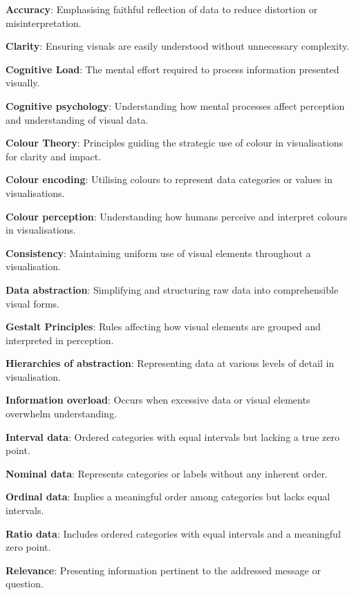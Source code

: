 \documentclass{article}\usepackage[]{graphicx}\usepackage[]{xcolor}
\numberwithin{equation}{section}
\begin{document}
\begin{itemise}
    \item \textbf{Accuracy}: Emphasising faithful reflection of data to reduce distortion or misinterpretation.
    \item \textbf{Clarity}: Ensuring visuals are easily understood without unnecessary complexity.
    \item \textbf{Cognitive Load}: The mental effort required to process information presented visually.
    \item \textbf{Cognitive psychology}: Understanding how mental processes affect perception and understanding of visual data.
    \item \textbf{Colour Theory}: Principles guiding the strategic use of colour in visualisations for clarity and impact.
    \item \textbf{Colour encoding}: Utilising colours to represent data categories or values in visualisations.
    \item \textbf{Colour perception}: Understanding how humans perceive and interpret colours in visualisations.
    \item \textbf{Consistency}: Maintaining uniform use of visual elements throughout a visualisation.
    \item \textbf{Data abstraction}: Simplifying and structuring raw data into comprehensible visual forms.
    \item \textbf{Gestalt Principles}: Rules affecting how visual elements are grouped and interpreted in perception.
    \item \textbf{Hierarchies of abstraction}: Representing data at various levels of detail in visualisation.
    \item \textbf{Information overload}: Occurs when excessive data or visual elements overwhelm understanding.
    \item \textbf{Interval data}: Ordered categories with equal intervals but lacking a true zero point.
    \item \textbf{Nominal data}: Represents categories or labels without any inherent order.
    \item \textbf{Ordinal data}: Implies a meaningful order among categories but lacks equal intervals.
    \item \textbf{Ratio data}: Includes ordered categories with equal intervals and a meaningful zero point.
    \item \textbf{Relevance}: Presenting information pertinent to the addressed message or question.
\end{itemise}
  
  

\newpage

\end{document}

